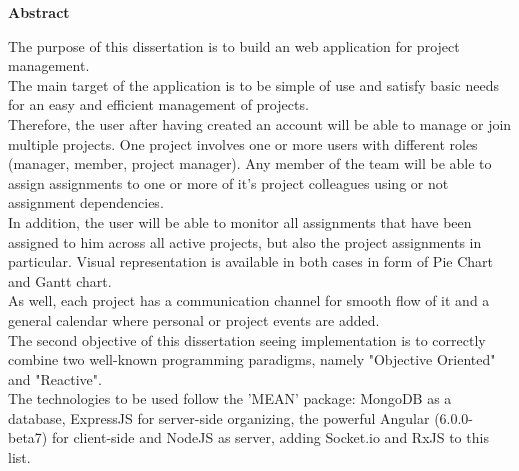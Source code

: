 \thispagestyle{plain}
\begin{center}
    \vspace{0.9cm}
    \huge
    \textbf{Abstract}
\end{center}
\quad The purpose of this dissertation is to build an web application for project management.\\
\null\quad The main target of the application is to be simple of use and satisfy basic
needs for an easy and efficient management of projects.\\
\null\quad Therefore, the user after having created an account will be able to manage
or join multiple projects. One project involves one or more
users with different roles (manager, member, project manager). Any member of the team will be able to assign assignments to one or more of it's project colleagues using or not assignment dependencies.\\
\null\quad In addition, the user will be able to monitor all assignments that have been assigned to him across all active projects, but also the project assignments in particular. Visual representation is available in both cases in form of Pie Chart and Gantt chart.\\
\null\quad As well, each project has a communication channel for smooth flow of it and a general calendar where personal or project events are added.\\
\null\quad The second objective of this dissertation seeing implementation is to correctly combine two well-known programming paradigms, namely "Objective Oriented" and "Reactive".\\
\null\quad The technologies to be used follow the 'MEAN' package: MongoDB as a database, ExpressJS for server-side organizing, the powerful Angular (6.0.0-beta7) for client-side and NodeJS as server, adding Socket.io and RxJS to this list.
